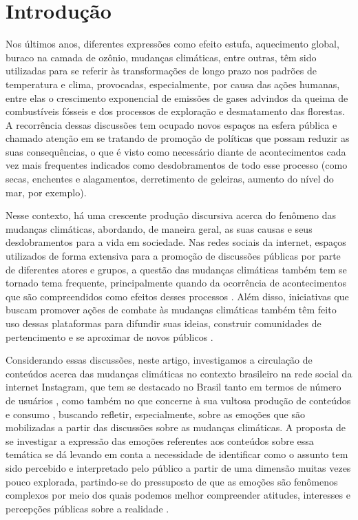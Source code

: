 \documentclass[portuguese]{textolivre}
\begin{document}
\begin{polyabstract}
\begin{english}
\begin{abstract}
\end{abstract}
\end{english}
\end{polyabstract}

\section{Introdução}\label{sec-intro}
Nos últimos anos, diferentes expressões como efeito estufa, aquecimento global, buraco na camada de ozônio, mudanças climáticas, entre outras, têm sido utilizadas para se referir às transformações de longo prazo nos padrões de temperatura e clima, provocadas, especialmente, por causa das ações humanas, entre elas o crescimento exponencial de emissões de gases advindos da queima de combustíveis fósseis e dos processos de exploração e desmatamento das florestas. A recorrência dessas discussões tem ocupado novos espaços na esfera pública e chamado atenção em se tratando de promoção de políticas que possam reduzir as suas consequências, o que é visto como necessário diante de acontecimentos cada vez mais frequentes indicados como desdobramentos de todo esse processo (como secas, enchentes e alagamentos, derretimento de geleiras, aumento do nível do mar, por exemplo).

Nesse contexto, há uma crescente produção discursiva acerca do fenômeno das mudanças climáticas, abordando, de maneira geral, as suas causas e seus desdobramentos para a vida em sociedade. Nas redes sociais da internet, espaços utilizados de forma extensiva para a promoção de discussões públicas por parte de diferentes atores e grupos, a questão das mudanças climáticas também tem se tornado tema frequente, principalmente quando da ocorrência de acontecimentos que são compreendidos como efeitos desses processos \cite{araujo2021brumadinho}. Além disso, iniciativas que buscam promover ações de combate às mudanças climáticas também têm feito uso dessas plataformas para difundir suas ideias, construir comunidades de pertencimento e se aproximar de novos públicos \cite{balbe2016mudancas}.

Considerando essas discussões, neste artigo, investigamos a circulação de conteúdos acerca das mudanças climáticas no contexto brasileiro na rede social da internet Instagram, que tem se destacado no Brasil tanto em termos de número de usuários \cite{bianchi2024socialmedia}, como também no que concerne à sua vultosa produção de conteúdos e consumo \cite{newman2023reuters}, buscando refletir, especialmente, sobre as emoções que são mobilizadas a partir das discussões sobre as mudanças climáticas. A proposta de se investigar a expressão das emoções referentes aos conteúdos sobre essa temática se dá levando em conta a necessidade de identificar como o assunto tem sido percebido e interpretado pelo público a partir de uma dimensão muitas vezes pouco explorada, partindo-se do pressuposto de que as emoções são fenômenos complexos \cite{barrett2017emotions} por meio dos quais podemos melhor compreender atitudes, interesses e percepções públicas sobre a realidade \cite{fernandesdeoliveira2023vacina}.
\end{document}
